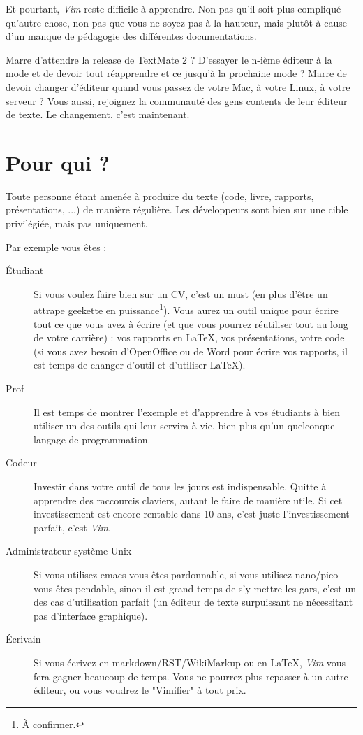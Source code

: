 Et pourtant, \emph{Vim} reste difficile à apprendre. Non pas qu'il soit plus compliqué qu'autre chose, non pas que vous ne soyez pas à la hauteur, mais plutôt à cause d'un manque de pédagogie des différentes documentations.

Marre d'attendre la release de TextMate 2 ? D'essayer le n-ième éditeur à la mode et de devoir tout réapprendre et ce jusqu'à la prochaine mode ? Marre de devoir changer d'éditeur quand vous passez de votre Mac, à votre Linux, à votre serveur ? Vous aussi, rejoignez la communauté des gens contents de leur éditeur de texte. Le changement, c'est maintenant.

\section{Pour qui ?}

Toute personne étant amenée à produire du texte (code, livre, rapports, présentations, ...) de manière régulière. Les développeurs sont bien sur une cible privilégiée, mais pas uniquement.

Par exemple vous êtes :
\begin{description}
    \item[Étudiant] Si vous voulez faire bien sur un CV, c'est un must (en plus d'être un attrape geekette en puissance\footnote{À confirmer.}). Vous aurez un outil unique pour écrire tout ce que vous avez à écrire (et que vous pourrez réutiliser tout au long de votre carrière) : vos rapports en \LaTeX, vos présentations, votre code (si vous avez besoin d'OpenOffice ou de Word pour écrire vos rapports, il est temps de changer d'outil et d'utiliser \LaTeX).
    \item[Prof] Il est temps de montrer l'exemple et d'apprendre à vos étudiants à bien utiliser un des outils qui leur servira à vie, bien plus qu'un quelconque langage de programmation.
    \item[Codeur] Investir dans votre outil de tous les jours est indispensable. Quitte à apprendre des raccourcis claviers, autant le faire de manière utile. Si cet investissement est encore rentable dans 10 ans, c'est juste l'investissement parfait, c'est \emph{Vim}.
    \item[Administrateur système Unix] Si vous utilisez emacs vous êtes pardonnable, si vous utilisez nano/pico vous êtes pendable, sinon il est grand temps de s'y mettre les gars, c'est un des cas d'utilisation parfait (un éditeur de texte surpuissant ne nécessitant pas d'interface graphique).
    \item[Écrivain] Si vous écrivez en markdown/RST/WikiMarkup ou en \LaTeX, \emph{Vim} vous fera gagner beaucoup de temps. Vous ne pourrez plus repasser à un autre éditeur, ou vous voudrez le "Vimifier" à tout prix.
\end{description}

